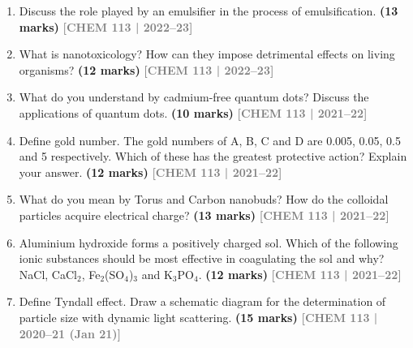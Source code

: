 \documentclass[12pt,a3paper]{article}
\newcommand{\yr}[1]{\hfill\textcolor{gray}{\small\textbf{[#1]}}}
\newcommand{\mk}[1]{\textcolor{orange!70!black}{\small\textbf{(#1 marks)}}}
\begin{document}
\begin{enumerate}



\item Discuss the role played by an emulsifier in the process of emulsification. \mk{13}
\yr{CHEM 113 | 2022--23}




\item What is nanotoxicology? How can they impose detrimental effects on living organisms? \mk{12}
\yr{CHEM 113 | 2022--23}




\item What do you understand by cadmium-free quantum dots? Discuss the applications of quantum dots. \mk{10}
\yr{CHEM 113 | 2021--22}




\item Define gold number. The gold numbers of A, B, C and D are 0.005, 0.05, 0.5 and 5 respectively. Which of these has the greatest protective action? Explain your answer. \mk{12}
\yr{CHEM 113 | 2021--22}




\item What do you mean by Torus and Carbon nanobuds? How do the colloidal particles acquire electrical charge? \mk{13}
\yr{CHEM 113 | 2021--22}




\item Aluminium hydroxide forms a positively charged sol. Which of the following ionic substances should be most effective in coagulating the sol and why? NaCl, CaCl$_2$, Fe$_2$(SO$_4$)$_3$ and K$_3$PO$_4$. \mk{12}
\yr{CHEM 113 | 2021--22}




\item Define Tyndall effect. Draw a schematic diagram for the determination of particle size with dynamic light scattering. \mk{15}
\yr{CHEM 113 | 2020--21 (Jan 21)}


\end{enumerate}
\end{document}
